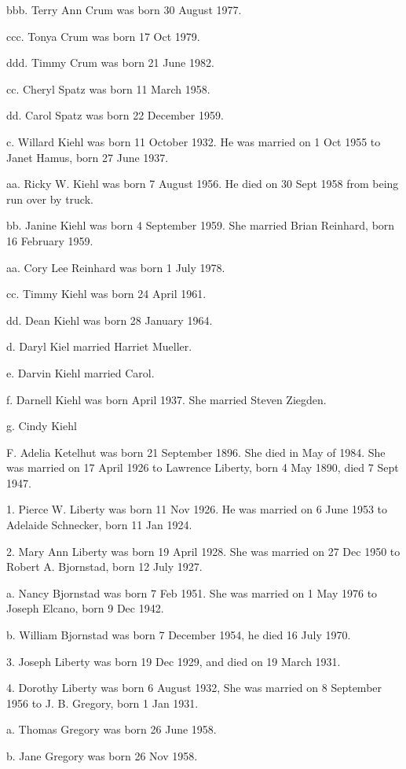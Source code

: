 \documentclass[a4paper]{article}
\begin{document}
bbb. Terry Ann Crum was born 30 August 1977.

ccc. Tonya Crum was  born 17 Oct 1979.

ddd. Timmy Crum was born 21 June 1982.

cc. Cheryl Spatz was born 11 March 1958.

dd. Carol Spatz was born 22 December 1959.

c. Willard Kiehl was born 11 October 1932.  He was married on 1 Oct 1955 to Janet Hamus, born 27 June 1937.

aa. Ricky W. Kiehl was born 7 August 1956.  He died on 30 Sept 1958 from being run over by truck.

bb. Janine Kiehl was born 4 September 1959.  She married Brian Reinhard, born 16 February 1959.

aa. Cory Lee Reinhard was born 1 July 1978.

cc. Timmy Kiehl was born 24 April 1961.

dd. Dean Kiehl was born 28 January 1964.

d. Daryl Kiel married Harriet Mueller.

e. Darvin Kiehl married Carol.

f. Darnell Kiehl was born April 1937.  She married Steven Ziegden.

g. Cindy Kiehl

F. Adelia Ketelhut was born 21 September 1896.  She died in May of 1984.  She was married on 17 April 1926 to Lawrence Liberty, born 4 May 1890, died 7 Sept 1947.

1. Pierce W. Liberty was born 11 Nov 1926.  He was married on 6 June 1953 to Adelaide Schnecker, born 11 Jan 1924.

2. Mary Ann Liberty was born 19 April 1928.  She was married on 27 Dec 1950 to Robert A. Bjornstad, born 12 July 1927.

a. Nancy Bjornstad was born 7 Feb 1951.  She was married on 1 May 1976 to Joseph Elcano, born 9 Dec 1942.

b. William Bjornstad was born 7 December 1954, he died 16 July 1970.

3. Joseph Liberty was born 19 Dec 1929, and died on 19 March 1931.

4. Dorothy Liberty was born 6 August 1932,  She was married on 8 September 1956 to J. B. Gregory, born 1 Jan 1931.

a. Thomas Gregory was born 26 June 1958.

b. Jane Gregory was born 26 Nov 1958.
\end{document}
